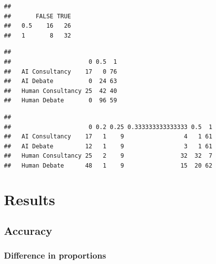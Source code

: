 \documentclass[
]{article}
\newenvironment{Shaded}{\begin{snugshade}}{\end{snugshade}}
\newcommand{\FunctionTok}[1]{\textcolor[rgb]{0.13,0.29,0.53}{\textbf{#1}}}
\newcommand{\NormalTok}[1]{#1}
\newcommand{\SpecialCharTok}[1]{\textcolor[rgb]{0.81,0.36,0.00}{\textbf{#1}}}
\begin{document}
\begin{verbatim}
##      
##       FALSE TRUE
##   0.5    16   26
##   1       8   32
\end{verbatim}

\begin{Shaded}
\end{Shaded}

\begin{verbatim}
##                    
##                      0 0.5  1
##   AI Consultancy    17   0 76
##   AI Debate          0  24 63
##   Human Consultancy 25  42 40
##   Human Debate       0  96 59
\end{verbatim}

\begin{Shaded}
\end{Shaded}

\begin{verbatim}
##                    
##                      0 0.2 0.25 0.333333333333333 0.5  1
##   AI Consultancy    17   1    9                 4   1 61
##   AI Debate         12   1    9                 3   1 61
##   Human Consultancy 25   2    9                32  32  7
##   Human Debate      48   1    9                15  20 62
\end{verbatim}

\section{Results}\label{results}

\subsection{Accuracy}\label{accuracy}

\subsubsection{Difference in
proportions}\label{difference-in-proportions}
\end{document}
